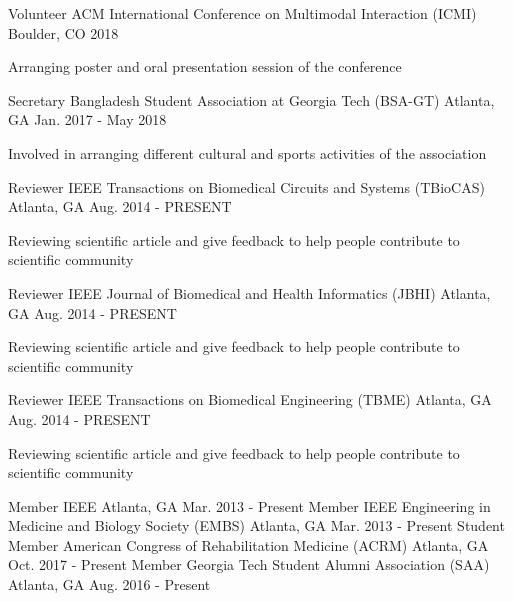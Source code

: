 \begin{cventries}
    \cventry
    {Volunteer}
    {ACM International Conference on Multimodal Interaction (ICMI)}
    {Boulder, CO}
    {2018}
    {
      \begin{cvitems}
        \item {Arranging poster and oral presentation session of the conference}
      \end{cvitems}
    }
    \cventry
    {Secretary}
    {Bangladesh Student Association at Georgia Tech (BSA-GT)}
    {Atlanta, GA}
    {Jan. 2017 - May 2018}
    {
      \begin{cvitems}
        \item {Involved in arranging different cultural and sports activities of the association}
      \end{cvitems}
    }
    \cventry
    {Reviewer}
    {IEEE Transactions on Biomedical Circuits and Systems (TBioCAS)}
    {Atlanta, GA}
    {Aug. 2014 - PRESENT}
    {
      \begin{cvitems}
        \item {Reviewing scientific article and give feedback to help people contribute to scientific community}
      \end{cvitems}
    }
    \cventry
    {Reviewer}
    {IEEE Journal of Biomedical and Health Informatics (JBHI)}
    {Atlanta, GA}
    {Aug. 2014 - PRESENT}
    {
      \begin{cvitems}
        \item {Reviewing scientific article and give feedback to help people contribute to scientific community}
      \end{cvitems}
    }
    \cventry
    {Reviewer}
    {IEEE Transactions on Biomedical Engineering (TBME)}
    {Atlanta, GA}
    {Aug. 2014 - PRESENT}
    {
      \begin{cvitems}
        \item {Reviewing scientific article and give feedback to help people contribute to scientific community}
      \end{cvitems}
    }
    \cventry
    {Member}
    {IEEE}
    {Atlanta, GA}
    {Mar. 2013 - Present}
    \cventry
    {Member}
    {IEEE Engineering in Medicine and Biology Society (EMBS)}
    {Atlanta, GA}
    {Mar. 2013 - Present}
    \cventry
    {Student Member}
    {American Congress of Rehabilitation Medicine (ACRM)}
    {Atlanta, GA}
    {Oct. 2017 - Present}
    \cventry
    {Member}
    {Georgia Tech Student Alumni Association (SAA)}
    {Atlanta, GA}
    {Aug. 2016 - Present}

\end{cventries}
